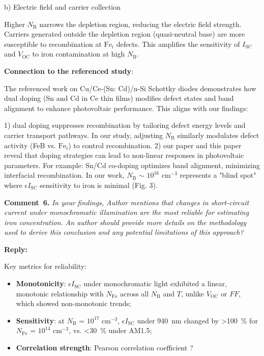 \documentclass[a4paper,fleqn]{cas-sc}
\begin{document}
b) Electric field and carrier collection

Higher $N_\mathrm{B}$ narrows the depletion region, reducing the electric field strength. Carriers generated outside the depletion region (quasi-neutral base) are more susceptible to recombination at $\mathrm{Fe}_i$ defects. This amplifies the sensitivity of $I_\mathrm{SC}$ and $V_\mathrm{OC}$ to iron contamination at high $N_\mathrm{B}$.

\textbf{Connection to the referenced study}:

The referenced work on Cu/Ce-(Sn: Cd)/n-Si Schottky diodes demonstrates how dual doping (Sn and Cd in Ce thin films) modifies defect states and band alignment to enhance photovoltaic performance. This aligns with our findings:

1) dual doping suppresses recombination by tailoring defect energy levels and carrier transport pathways. In our study, adjusting $N_\mathrm{B}$ similarly modulates defect activity (FeB vs. $\mathrm{Fe}_i$) to control recombination.
2) our paper and this paper reveal that doping strategies can lead to non-linear responses in photovoltaic parameters. For example: Sn/Cd co-doping optimizes band alignment, minimizing interfacial recombination. In our work,  $N_\mathrm{B}$ $\sim$ $10^{16}$ cm$^{-3}$ represents a "blind spot" where $\epsilon I_\mathrm{SC}$ sensitivity to iron is minimal (Fig. 3).

\vspace{1cm}
\noindent
\textcolor[rgb]{0.00,0.50,1.00}{\textbf{Comment~6.}}
\emph{In your findings, Author mentions that changes in short-circuit current under monochromatic illumination are the most reliable for estimating iron concentration. An author should provide more details on the methodology used to derive this conclusion and any potential limitations of this approach?}

\noindent
\textcolor[rgb]{0.51,0.00,0.00}{\textbf{Reply:}}

Key metrics for reliability:

\begin{itemize}
    \item \textbf{Monotonicity}: $\epsilon I_\mathrm{SC}$ under monochromatic light exhibited a linear, monotonic relationship with $N_\mathrm{Fe}$ across all $N_\mathrm{B}$ and $T$, unlike $V_\mathrm{OC}$ or $FF$, which showed non-monotonic trends;
    \item \textbf{Sensitivity}: at $N_\mathrm{B}$ = $10^{17}$ cm$^{-3}$, $\epsilon I_\mathrm{SC}$ under 940~nm changed by >100~\% for $N_\mathrm{Fe}$ = $10^{14}$ cm$^{-3}$, vs. <30~\% under AM1.5;
    \item \textbf{Correlation strength}: Pearson correlation coefficient ?
\end{itemize}
\end{document}
